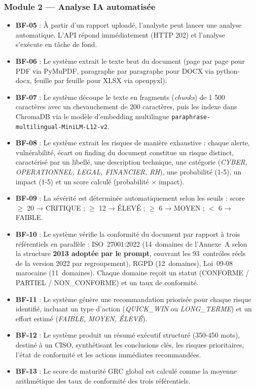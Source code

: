 \documentclass[a4paper,12pt,oneside]{report}
\begin{document}
	\subsubsection*{Module 2 — Analyse IA automatisée}
	
	\begin{itemize}
		\item \textbf{BF-05} : À partir d'un rapport uploadé, l'analyste peut
		lancer une analyse automatique. L'API répond immédiatement (HTTP 202)
		et l'analyse s'exécute en tâche de fond.
		\item \textbf{BF-06} : Le système extrait le texte brut du document
		(page par page pour PDF via PyMuPDF, paragraphe par paragraphe pour
		DOCX via python-docx, feuille par feuille pour XLSX via openpyxl).
		\item \textbf{BF-07} : Le système découpe le texte en fragments
		(\textit{chunks}) de 1 500 caractères avec un chevauchement de 200
		caractères, puis les indexe dans ChromaDB via le modèle d'embedding
		multilingue \texttt{paraphrase-multilingual-MiniLM-L12-v2}.
		\item \textbf{BF-08} : Le système extrait les risques de manière
		exhaustive : chaque alerte, vulnérabilité, écart ou finding du document
		constitue un risque distinct, caractérisé par un libellé, une
		description technique, une catégorie (\textit{CYBER, OPERATIONNEL,
			LEGAL, FINANCIER, RH}), une probabilité (1-5), un impact (1-5) et
		un score calculé (probabilité × impact).
		\item \textbf{BF-09} : La sévérité est déterminée automatiquement selon
		les seuils : score $\geq$ 20 → CRITIQUE ; $\geq$ 12 → ÉLEVÉ ;
		$\geq$ 6 → MOYEN ; $<$ 6 → FAIBLE.
		\item \textbf{BF-10} : Le système vérifie la conformité du document par
		rapport à trois référentiels en parallèle : ISO~27001:2022 (14~domaines de l'Annexe~A selon la structure \textbf{2013 adopt\'ee par le prompt}, couvrant les 93~contr\'oles r\'eels de la version 2022 par regroupement), RGPD (12~domaines), Loi~09-08 marocaine (11~domaines).
		Chaque domaine reçoit un statut (CONFORME / PARTIEL / NON\_CONFORME)
		et un taux de conformité.
		\item \textbf{BF-11} : Le système génère une recommandation priorisée
		pour chaque risque identifié, incluant un type d'action
		(\textit{QUICK\_WIN} ou \textit{LONG\_TERME}) et un effort estimé
		(\textit{FAIBLE, MOYEN, ÉLEVÉ}).
		\item \textbf{BF-12} : Le système produit un résumé exécutif structuré
		(350-450 mots), destiné à un CISO, synthétisant les conclusions
		clés, les risques prioritaires, l'état de conformité et les actions
		immédiates recommandées.
		\item \textbf{BF-13} : Le score de maturité GRC global est calculé comme
		la moyenne arithmétique des taux de conformité des trois référentiels.
	\end{itemize}
	
\end{document}
